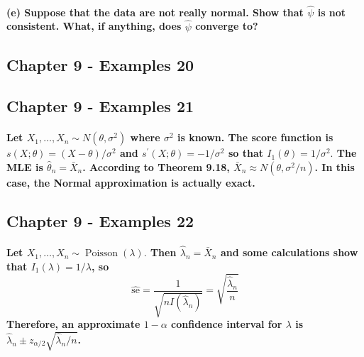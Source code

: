 \documentclass{article}
\begin{document}
\paragraph{(e) Suppose that the data are not really normal. Show that $\widehat{\psi}$ is not consistent. What, if anything, does $\widehat{\psi}$ converge to?}

\subsection{Chapter 9 - Examples 20}
\subsection{Chapter 9 - Examples 21}
\paragraph{Let $X_{1}, \ldots, X_{n} \sim N\left(\theta, \sigma^{2}\right)$ where $\sigma^{2}$ is known. The score function is $s(X ; \theta)=(X-\theta) / \sigma^{2}$ and $s^{\prime}(X ; \theta)=-1 / \sigma^{2}$ so that $I_{1}(\theta)=1 / \sigma^{2} .$ The MLE is $\widehat{\theta}_{n}=\bar{X}_{n}$. According to Theorem 9.18, $\bar{X}_{n} \approx N\left(\theta, \sigma^{2} / n\right)$. In this case, the Normal approximation is actually exact.}

\subsection{Chapter 9 - Examples 22}
\paragraph{Let $X_{1}, \ldots, X_{n} \sim \operatorname{Poisson}(\lambda) .$ Then $\widehat{\lambda}_{n}=\bar{X}_{n}$ and some calculations show that $I_{1}(\lambda)=1 / \lambda$, so
    $$
        \widehat{\mathrm{se}}=\frac{1}{\sqrt{n I\left(\widehat{\lambda}_{n}\right)}}=\sqrt{\frac{\widehat{\lambda}_{n}}{n}}
    $$
    Therefore, an approximate $1-\alpha$ confidence interval for $\lambda$ is $\widehat{\lambda}_{n} \pm z_{\alpha / 2} \sqrt{\widehat{\lambda}_{n} / n}$.}
\end{document}
